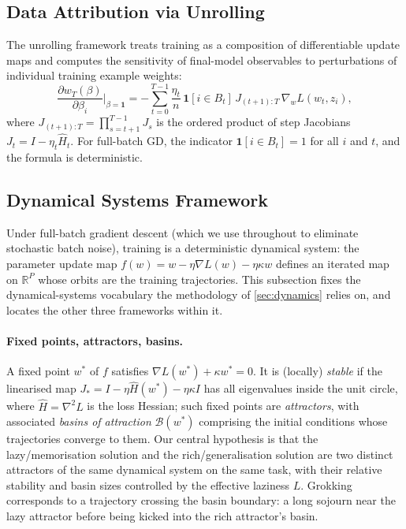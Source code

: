 \documentclass[11pt,a4paper]{article}
\begin{document}
\subsection{Data Attribution via Unrolling}\label{sec:bg_unrolling}

The unrolling framework \citep{bae2024source, jaburi2026data} treats training as a composition of differentiable update maps and computes the sensitivity of final-model observables to perturbations of individual training example weights:
\begin{equation}\label{eq:unrolling}
    \frac{\partial w_T(\beta)}{\partial \beta_i}\bigg|_{\beta=\mathbf{1}} = -\sum_{t=0}^{T-1} \frac{\eta_t}{n}\, \mathbf{1}[i \in B_t]\, J_{(t+1):T}\, \nabla_w L(w_t, z_i),
\end{equation}
where $J_{(t+1):T} = \prod_{s=t+1}^{T-1} J_s$ is the ordered product of step Jacobians $J_t = I - \eta_t \hat{H}_t$. For full-batch GD, the indicator $\mathbf{1}[i \in B_t] = 1$ for all $i$ and $t$, and the formula is deterministic.

\subsection{Dynamical Systems Framework}\label{sec:bg_dynamics}

Under full-batch gradient descent (which we use throughout to eliminate stochastic batch noise), training is a deterministic dynamical system: the parameter update map $f(w) = w - \eta \nabla L(w) - \eta \kappa w$ defines an iterated map on $\mathbb{R}^P$ whose orbits are the training trajectories. This subsection fixes the dynamical-systems vocabulary the methodology of \cref{sec:dynamics} relies on, and locates the other three frameworks within it.

\paragraph{Fixed points, attractors, basins.} A fixed point $w^*$ of $f$ satisfies $\nabla L(w^*) + \kappa w^* = 0$. It is (locally) \emph{stable} if the linearised map $J_* = I - \eta\hat{H}(w^*) - \eta\kappa I$ has all eigenvalues inside the unit circle, where $\hat{H} = \nabla^2 L$ is the loss Hessian; such fixed points are \emph{attractors}, with associated \emph{basins of attraction} $\mathcal{B}(w^*)$ comprising the initial conditions whose trajectories converge to them. Our central hypothesis is that the lazy/memorisation solution and the rich/generalisation solution are two distinct attractors of the same dynamical system on the same task, with their relative stability and basin sizes controlled by the effective laziness $L$. Grokking corresponds to a trajectory crossing the basin boundary: a long sojourn near the lazy attractor before being kicked into the rich attractor's basin.
\end{document}
